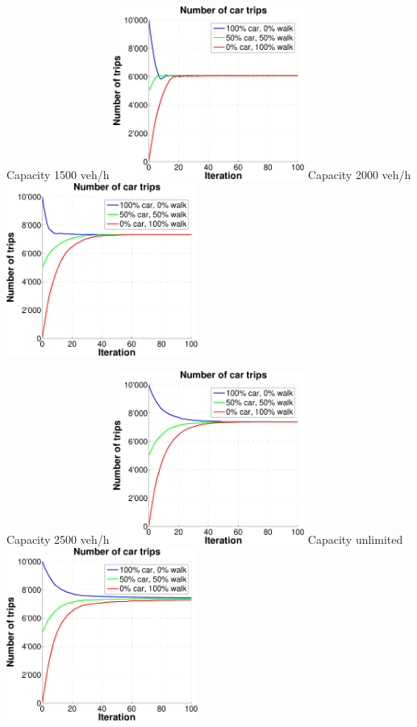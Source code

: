 {  \createsubfigure%
  {Capacity 1500 veh/h}%
  {\includegraphics[width=0.47\textwidth, angle=0, trim=0mm 0mm 0mm 9mm, clip=true]{extending/figures/MultiModalSimulation/simulations/num_car_trips_1500}}%
  {\label{}}%
  {\hspace{3mm}}%
  \createsubfigure%
  {Capacity 2000 veh/h}%
  {\includegraphics[width=0.47\textwidth, angle=0, trim=0mm 0mm 0mm 9mm, clip=true]{extending/figures/MultiModalSimulation/simulations/num_car_trips_2000}}%
  {\label{}}%
  {\vspace{7.5mm}}%

  \createsubfigure%
  {Capacity 2500 veh/h}%
  {\includegraphics[width=0.47\textwidth, angle=0, trim=0mm 0mm 0mm 9mm, clip=true]{extending/figures/MultiModalSimulation/simulations/num_car_trips_2500}}%
  {\label{}}%
  {\hspace{3mm}}%
  \createsubfigure%
  {Capacity unlimited}%
  {\includegraphics[width=0.47\textwidth, angle=0, trim=0mm 0mm 0mm 9mm, clip=true]{extending/figures/MultiModalSimulation/simulations/num_car_trips_unlimited}}%
  {\label{}}%
  {}%
}%
